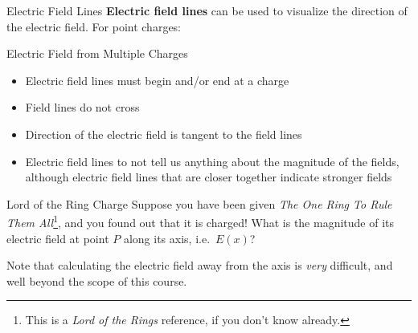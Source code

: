 \documentclass[12pt,aspectratio=169]{beamer}
\begin{document}
\begin{frame}{Electric Field Lines}
  \textbf{Electric field lines} can be used to visualize the direction of the
  electric field. For point charges:
  \begin{center}
    \hspace{.2in}
  \end{center}
\end{frame}



\begin{frame}{Electric Field from Multiple Charges}
  \begin{center}
  \end{center}
  \begin{itemize}
  \item Electric field lines must begin and/or end at a charge
  \item Field lines do not cross
  \item Direction of the electric field is tangent to the field lines
  \item Electric field lines to not tell us anything about the magnitude of the
    fields, although electric field lines that are closer together indicate
    stronger fields
  \end{itemize}
\end{frame}



\begin{frame}{Lord of the Ring Charge}
  Suppose you have been given \emph{The One Ring To Rule Them All}\footnote{This
  is a \emph{Lord of the Rings} reference, if you don't know already.}, and you
  found out that it is charged! What is the magnitude of its electric field at
  point $P$ along its axis, i.e.\ $E(x)$?
  \begin{center}
  \end{center}
  Note that calculating the electric field away from the axis is \emph{very}
  difficult, and well beyond the scope of this course.
  \vspace{.2in}
\end{frame}
\end{document}
